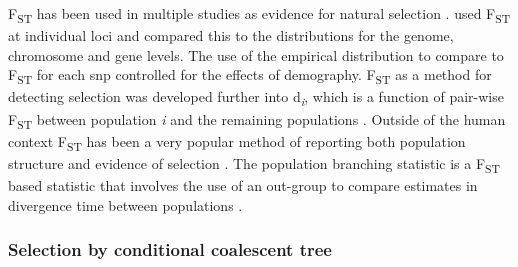 \documentclass[]{report}
\begin{document}
F\textsubscript{ST} has been used in multiple studies as evidence for
natural selection
\citep{Akey2012, myles2007identification, pickrell2009signals}.
\citet{Akey2012} used F\textsubscript{ST} at individual loci and
compared this to the distributions for the genome, chromosome and gene
levels. The use of the empirical distribution to compare to
F\textsubscript{ST} for each \gls{snp} controlled for the effects of
demography. F\textsubscript{ST} as a method for detecting selection was
developed further into d\textsubscript{\emph{i}}, which is a function of
pair-wise F\textsubscript{ST} between population \emph{i} and the
remaining populations \citep{Akey2010}. Outside of the human context
F\textsubscript{ST} has been a very popular method of reporting both
population structure and evidence of selection
\citep{Akey2010, Hancock2011, Qanbari2011, Wei2015b}. The population
branching statistic is a F\textsubscript{ST} based statistic that
involves the use of an out-group to compare estimates in divergence time
between populations \citep{Yi2010b}.

\subsubsection{Selection by conditional coalescent
tree}\label{selection-by-conditional-coalescent-tree}
\end{document}
